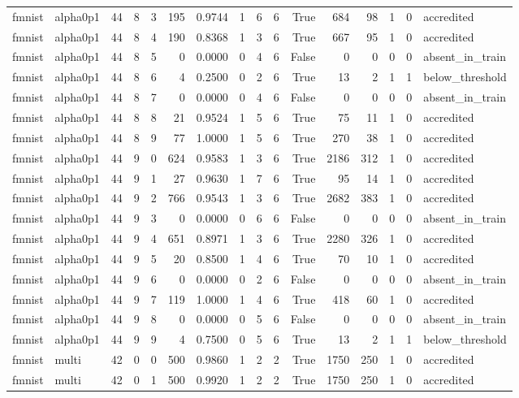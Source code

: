 \begin{tabular}{llrrrrrrrrrrrrrl}
fmnist & alpha0p1 & 44 & 8 & 3 & 195 & 0.9744 & 1 & 6 & 6 & True & 684 & 98 & 1 & 0 & accredited \\
fmnist & alpha0p1 & 44 & 8 & 4 & 190 & 0.8368 & 1 & 3 & 6 & True & 667 & 95 & 1 & 0 & accredited \\
fmnist & alpha0p1 & 44 & 8 & 5 & 0 & 0.0000 & 0 & 4 & 6 & False & 0 & 0 & 0 & 0 & absent\_in\_train \\
fmnist & alpha0p1 & 44 & 8 & 6 & 4 & 0.2500 & 0 & 2 & 6 & True & 13 & 2 & 1 & 1 & below\_threshold \\
fmnist & alpha0p1 & 44 & 8 & 7 & 0 & 0.0000 & 0 & 4 & 6 & False & 0 & 0 & 0 & 0 & absent\_in\_train \\
fmnist & alpha0p1 & 44 & 8 & 8 & 21 & 0.9524 & 1 & 5 & 6 & True & 75 & 11 & 1 & 0 & accredited \\
fmnist & alpha0p1 & 44 & 8 & 9 & 77 & 1.0000 & 1 & 5 & 6 & True & 270 & 38 & 1 & 0 & accredited \\
fmnist & alpha0p1 & 44 & 9 & 0 & 624 & 0.9583 & 1 & 3 & 6 & True & 2186 & 312 & 1 & 0 & accredited \\
fmnist & alpha0p1 & 44 & 9 & 1 & 27 & 0.9630 & 1 & 7 & 6 & True & 95 & 14 & 1 & 0 & accredited \\
fmnist & alpha0p1 & 44 & 9 & 2 & 766 & 0.9543 & 1 & 3 & 6 & True & 2682 & 383 & 1 & 0 & accredited \\
fmnist & alpha0p1 & 44 & 9 & 3 & 0 & 0.0000 & 0 & 6 & 6 & False & 0 & 0 & 0 & 0 & absent\_in\_train \\
fmnist & alpha0p1 & 44 & 9 & 4 & 651 & 0.8971 & 1 & 3 & 6 & True & 2280 & 326 & 1 & 0 & accredited \\
fmnist & alpha0p1 & 44 & 9 & 5 & 20 & 0.8500 & 1 & 4 & 6 & True & 70 & 10 & 1 & 0 & accredited \\
fmnist & alpha0p1 & 44 & 9 & 6 & 0 & 0.0000 & 0 & 2 & 6 & False & 0 & 0 & 0 & 0 & absent\_in\_train \\
fmnist & alpha0p1 & 44 & 9 & 7 & 119 & 1.0000 & 1 & 4 & 6 & True & 418 & 60 & 1 & 0 & accredited \\
fmnist & alpha0p1 & 44 & 9 & 8 & 0 & 0.0000 & 0 & 5 & 6 & False & 0 & 0 & 0 & 0 & absent\_in\_train \\
fmnist & alpha0p1 & 44 & 9 & 9 & 4 & 0.7500 & 0 & 5 & 6 & True & 13 & 2 & 1 & 1 & below\_threshold \\
fmnist & multi & 42 & 0 & 0 & 500 & 0.9860 & 1 & 2 & 2 & True & 1750 & 250 & 1 & 0 & accredited \\
fmnist & multi & 42 & 0 & 1 & 500 & 0.9920 & 1 & 2 & 2 & True & 1750 & 250 & 1 & 0 & accredited \\

\end{tabular}

